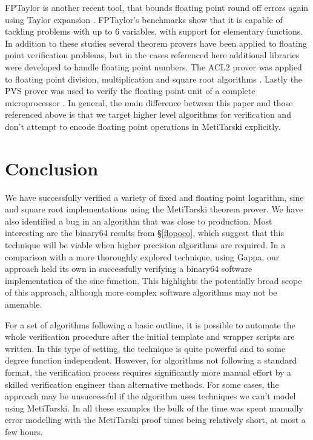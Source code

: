 \documentclass{fac}
\begin{document}
FPTaylor is another recent tool, that bounds floating point round off errors again using Taylor expansion \cite{solovyev2018rigorous}. FPTaylor's benchmarks show that it is capable of tackling problems with up to 6 variables, with support for elementary functions. In addition to these studies several theorem provers have been applied to floating point verification problems, but in the cases referenced here additional libraries were developed to handle floating point numbers. The ACL2 prover was applied to floating point division, multiplication and square root algorithms \cite{russinoff1998mechanically,moore1996mechanically}. Lastly the PVS prover was used to verify the floating point unit of a complete microprocessor \cite{jacobi2005formal}. In general, the main difference between this paper and those referenced above is that we target higher level algorithms for verification and don't attempt to encode floating point operations in MetiTarski explicitly. 

\section{Conclusion}
\label{Conclusion}
We have successfully verified a variety of fixed and floating point logarithm, sine and square root implementations using the MetiTarski theorem prover. We have also identified a bug in an algorithm that was close to production. Most interesting are the binary64 results from \S \ref{flopoco}, which suggest that this technique will be viable when higher precision algorithms are required. In a comparison with a more thoroughly explored technique, using Gappa, our approach held its own in successfully verifying a binary64 software implementation of the sine function. This highlights the potentially broad scope of this approach, although more complex software algorithms may not be amenable. 

For a set of algorithms following a basic outline, it is possible to automate the whole verification procedure after the initial template and wrapper scripts are written. In this type of setting, the technique is quite powerful and to some degree function independent. However, for algorithms not following a standard format, the verification process requires significantly more manual effort by a skilled verification engineer than alternative methods. For some cases, the approach may be unsuccessful if the algorithm uses techniques we can't model using MetiTarski. In all these examples the bulk of the time was spent manually error modelling with the MetiTarski proof times being relatively short, at most a few hours. 
\end{document}

